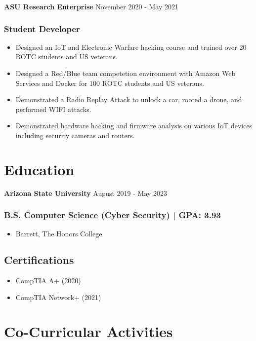 \documentclass{article}
\newcommand{\resumesubsection}[2]{
	\noindent \textbf{#1} \hfill #2
}
\begin{document}
\resumesubsection{ASU Research Enterprise}{November 2020 - May 2021}
\subsubsection{Student Developer}
\begin{itemize}[noitemsep, topsep=0pt]
    \item Designed an IoT and Electronic Warfare hacking course and trained over 20 ROTC students and US veterans.
    \item Designed a Red/Blue team competetion environment with Amazon Web Services and Docker for 100 ROTC students and US veterans.
    \item Demonstrated a Radio Replay Attack to unlock a car, rooted a drone, and performed WIFI attacks.
    \item Demonstrated hardware hacking and firmware analysis on various IoT devices including security cameras and routers.
\end{itemize}


\section{Education}

\resumesubsection{Arizona State University}{August 2019 - May 2023}
\subsubsection{B.S. Computer Science (Cyber Security) | GPA: 3.93}
\begin{itemize}[noitemsep, topsep=0pt]
	\item Barrett, The Honors College
\end{itemize}

\subsection{Certifications}
\begin{itemize}[noitemsep, topsep=0pt]
    \item CompTIA A+ (2020)
    \item CompTIA Network+ (2021)
\end{itemize}

\section{Co-Curricular Activities}
\end{document}
